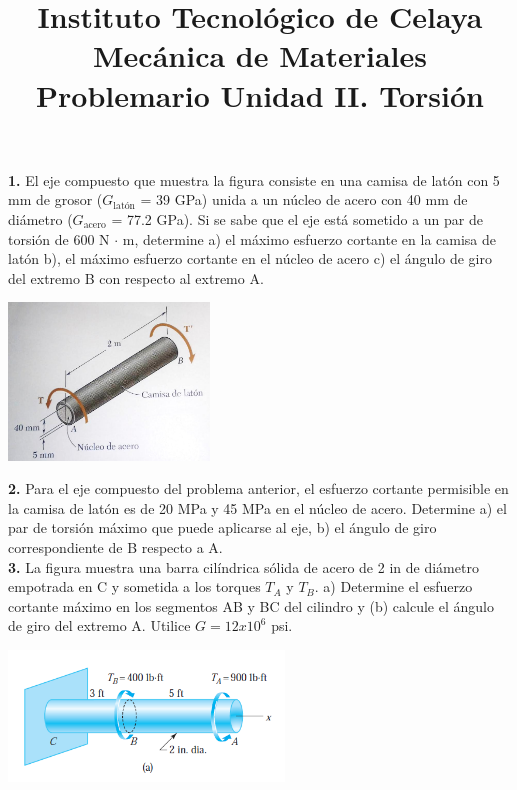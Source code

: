 \documentclass[12pt,letterpaper]{article}
\title{
{
{\large Instituto Tecnológico de Celaya} \\[-2mm]
\large Mecánica de Materiales} \\[-2mm]
{\large Problemario Unidad II. Torsión} \\[-2mm]
}
\date{}
\begin{document}
\maketitle

\vspace{-10mm}


\textbf{1.} El eje compuesto que muestra la figura consiste en una camisa de latón con 5 mm de grosor 
($G_{\text{latón}}$ = 39 GPa) unida a un núcleo de acero con 40 mm de diámetro ($G_{\text{acero}}$ = 77.2 GPa). 
Si se sabe que el eje está sometido a un par de torsión de 600 N $\cdot$ m, determine a) el máximo esfuerzo 
cortante en la camisa de latón b), el máximo esfuerzo cortante en el núcleo de acero c) el ángulo de giro 
del extremo B con respecto al extremo A.

\begin{center}
\includegraphics[width=0.4\textwidth]{img/p1.jpg}
\end{center}

\textbf{2.} Para el eje compuesto del problema anterior, el esfuerzo cortante permisible en la camisa de 
latón es de 20 MPa y 45 MPa en el núcleo de acero. Determine a) el par de torsión máximo que puede 
aplicarse al eje, b) el ángulo de giro correspondiente de B respecto a A. \\

\textbf{3.} La figura muestra una barra cilíndrica sólida de acero de 2 in de diámetro empotrada en C y sometida a 
los torques $T_A$ y $T_B$. a) Determine el esfuerzo cortante máximo en los segmentos AB y BC del cilindro 
y (b) calcule el ángulo de giro del extremo A. Utilice $G=12x10^6$ psi.

\begin{center}
\includegraphics[width=0.55\textwidth]{img/p3.PNG}    
\end{center}
\end{document}

